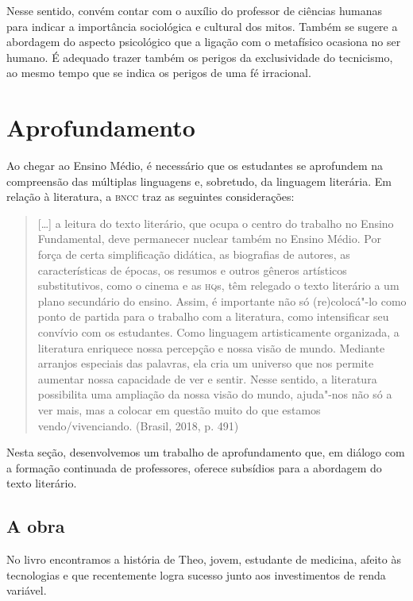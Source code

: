 \documentclass[12pt]{extarticle}
\begin{document}
Nesse sentido, convém contar com o auxílio do professor de ciências
humanas para indicar a importância sociológica e cultural dos mitos.
Também se sugere a abordagem do aspecto psicológico que a ligação com o
metafísico ocasiona no ser humano. É adequado trazer também os perigos
da exclusividade do tecnicismo, ao mesmo tempo que se indica os perigos
de uma fé irracional.

\section{Aprofundamento}

Ao chegar ao Ensino Médio, é necessário que os estudantes se aprofundem
na compreensão das múltiplas linguagens e, sobretudo, da linguagem
literária. Em relação à literatura, a \textsc{bncc} traz as seguintes
considerações:


\begin{quote}
{[}\ldots{}{]} a leitura do texto literário, que ocupa o centro do trabalho
no Ensino Fundamental, deve permanecer nuclear também no Ensino Médio.
Por força de certa simplificação didática, as biografias de autores, as
características de épocas, os resumos e outros gêneros artísticos
substitutivos, como o cinema e as \textsc{hq}s, têm relegado o texto literário a
um plano secundário do ensino. Assim, é importante não só (re)colocá"-lo
como ponto de partida para o trabalho com a literatura, como
intensificar seu convívio com os estudantes. Como linguagem
artisticamente organizada, a literatura enriquece nossa percepção e
nossa visão de mundo. Mediante arranjos especiais das palavras, ela cria
um universo que nos permite aumentar nossa capacidade de ver e sentir.
Nesse sentido, a literatura possibilita uma ampliação da nossa visão do
mundo, ajuda"-nos não só a ver mais, mas a colocar em questão muito do
que estamos vendo/vivenciando. (Brasil, 2018, p. 491)
\end{quote}

Nesta seção, desenvolvemos um trabalho de aprofundamento que, em diálogo
com a formação continuada de professores, oferece subsídios para a
abordagem do texto literário.

\subsection{A obra}

No livro encontramos a história de Theo, jovem, estudante de medicina,
afeito às tecnologias e que recentemente logra sucesso junto aos
investimentos de renda variável.
\end{document}
